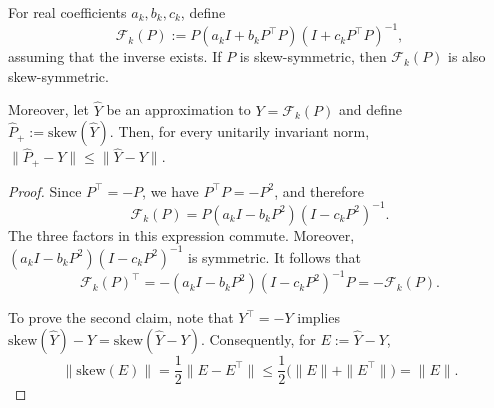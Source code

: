 \documentclass[final,onefignum,onetabnum,dvipsnames]{siamart251216}
\numberwithin{algorithm}{section}
\numberwithin{equation}{section}
\begin{document}
\begin{proposition}
\label{prop:skew-projected-polar-iteration}
For real coefficients $a_k,b_k,c_k$, define
\[
    \mathcal F_k(P)
    :=
    P(a_kI+b_kP^\top P)(I+c_kP^\top P)^{-1},    
\]
assuming that the inverse exists. If $P$ is skew-symmetric, then
$\mathcal F_k(P)$ is also skew-symmetric.

Moreover, let $\widehat Y$ be an approximation to
$Y=\mathcal F_k(P)$ and define
$
    \widehat P_+
    :=
    \mathrm{skew}(\widehat Y).
$
Then, for every unitarily invariant norm,
$
    \|\widehat P_+-Y\|
    \leq
    \|\widehat Y-Y\|.
$
\end{proposition}

\begin{proof}
Since $P^\top=-P$, we have $P^\top P=-P^2$, and therefore
\[
    \mathcal F_k(P)
    =
    P(a_kI-b_kP^2)(I-c_kP^2)^{-1}.
\]
The three factors in this expression commute. Moreover,
$(a_kI-b_kP^2)(I-c_kP^2)^{-1}$ is symmetric. It follows that
\[
    \mathcal F_k(P)^\top
    =
    -(a_kI-b_kP^2)(I-c_kP^2)^{-1}P
    =
    -\mathcal F_k(P).
\]

To prove the second claim, note that $Y^\top=-Y$ implies
$
    \mathrm{skew}(\widehat Y)-Y
    =
    \mathrm{skew}(\widehat Y-Y).
$
Consequently, for $E:=\widehat Y-Y$,
\[
    \|\mathrm{skew}(E)\|
    =
    \frac12\|E-E^\top\|
    \leq
    \frac12\bigl(\|E\|+\|E^\top\|\bigr)
    =
    \|E\|.
\]
\end{proof}
\end{document}
